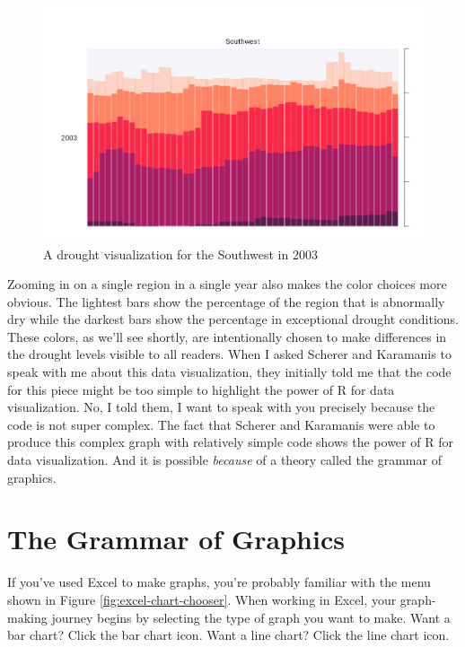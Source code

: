 \documentclass[
]{book}
\begin{document}
\begin{figure}
\includegraphics[width=1\linewidth]{data-viz_files/figure-latex/viz-sw-2003-1} \caption{A drought visualization for the Southwest in 2003}\label{fig:viz-sw-2003}
\end{figure}

Zooming in on a single region in a single year also makes the color choices more obvious. The lightest bars show the percentage of the region that is abnormally dry while the darkest bars show the percentage in exceptional drought conditions. These colors, as we'll see shortly, are intentionally chosen to make differences in the drought levels visible to all readers.
When I asked Scherer and Karamanis to speak with me about this data visualization, they initially told me that the code for this piece might be too simple to highlight the power of R for data visualization. No, I told them, I want to speak with you precisely because the code is not super complex. The fact that Scherer and Karamanis were able to produce this complex graph with relatively simple code shows the power of R for data visualization. And it is possible \emph{because} of a theory called the grammar of graphics.

\hypertarget{the-grammar-of-graphics}{%
\section*{The Grammar of Graphics}\label{the-grammar-of-graphics}}

If you've used Excel to make graphs, you're probably familiar with the menu shown in Figure \ref{fig:excel-chart-chooser}. When working in Excel, your graph-making journey begins by selecting the type of graph you want to make. Want a bar chart? Click the bar chart icon. Want a line chart? Click the line chart icon.
\end{document}

